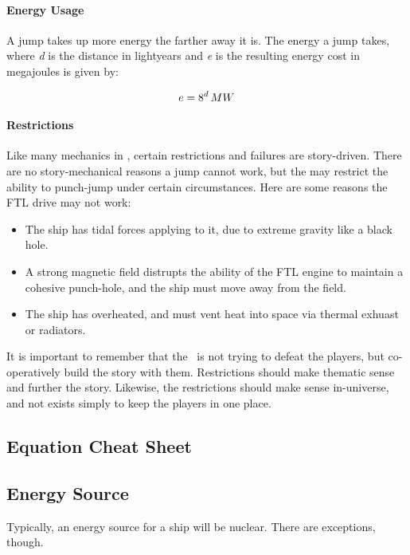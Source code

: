 \paragraph{Energy Usage}A jump takes up more energy the farther away it is. The energy a jump takes, where \textit{d} is the distance in lightyears and \textit{e} is the resulting energy cost in megajoules is given by:

\par
\[e = 8^d\, MW\]

\paragraph{Restrictions}Like many mechanics in \getTitle, certain restrictions and failures are story-driven. There are no story-mechanical reasons a jump cannot work, but the \gm may restrict the ability to punch-jump under certain circumstances. Here are some reasons the FTL drive may not work:

\begin{itemize}
	\item The ship has tidal forces applying to it, due to extreme gravity like a black hole.
	\item A strong magnetic field distrupts the ability of the FTL engine to maintain a cohesive punch-hole, and the ship must move away from the field.
	\item The ship has overheated, and must vent heat into space via thermal exhuast or radiators.
\end{itemize}

\par It is important to remember that the \gm\, is not trying to defeat the players, but co-operatively build the story with them. Restrictions should make thematic sense and further the story. Likewise, the restrictions should make sense in-universe, and not exists simply to keep the players in one place.


\subsection{Equation Cheat Sheet}

\subsection{Energy Source}
\par
Typically, an energy source for a ship will be nuclear. There are exceptions, though.

